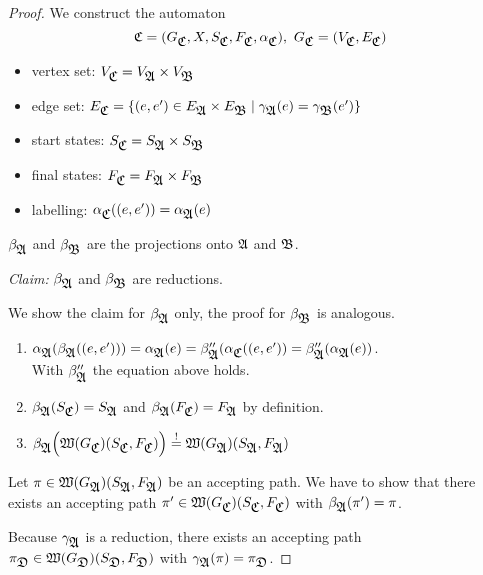 \begin{proof}
We construct the automaton
\[ \fa{C} = (G_{\fa{C}}, X, S_{\fa{C}}, F_{\fa{C}}, \alpha_{\fa{C}}),\
G_{\fa{C}}=(V_{\fa{C}}, E_{\fa{C}}) \]
\begin{itemize}
\item vertex set: $V_{\fa{C}} = V_{\fa{A}} \times V_{\fa{B}}$
\item edge set: $ E_{\fa{C}} = \setof{(e, e') \in E_{\fa{A}} \times
E_{\fa{B}} \mid \gamma_{\fa{A}}(e) = \gamma_{\fa{B}}(e')}$
\item start states: $S_{\fa{C}} = S_{\fa{A}} \times S_{\fa{B}}$
\item final states: $F_{\fa{C}} = F_{\fa{A}} \times F_{\fa{B}}$
\item labelling: $\alpha_{\fa{C}}((e, e')) = \alpha_{\fa{A}}(e)$ 
\end{itemize}

$\beta_{\fa{A}}$ and $\beta_{\fa{B}}$ are the projections onto $\fa{A}$ and
$\fa{B}$.

{\em Claim:} $\beta_{\fa{A}}$ and $\beta_{\fa{B}}$ are reductions.

We show the claim for $\beta_{\fa{A}}$ only, the proof for $\beta_{\fa{B}}$ is
analogous.

\begin{enumerate}
	\item $\alpha_{\fa{A}}(\beta_{\fa{A}}((e,e'))) = \alpha_{\fa{A}}(e) =
	\beta''_{\fa{A}}(\alpha_{\fa{C}}((e, e')) =
	\beta''_{\fa{A}}(\alpha_{\fa{A}}(e))$. \\
	With $\beta''_{\fa{A}}$ the equation above holds.
	
	\item $\beta_{\fa{A}}(S_{\fa{C}}) = S_{\fa{A}}$ and $\beta_{\fa{A}}(F_{\fa{C}})
	= F_{\fa{A}}$ by definition.
	
	\item $\beta_{\fa{A}}\Big(\pathcat{G_{\fa{C}}}(S_{\fa{C}}, F_{\fa{C}})\Big)
	\stackrel{!}{=} \pathcat{G_{\fa{A}}}(S_{\fa{A}}, F_{\fa{A}})$
\end{enumerate}

Let $\pi \in \pathcat{G_{\fa{A}}}(S_{\fa{A}}, F_{\fa{A}})$ be an accepting path.
We have to show that there exists an accepting path $\pi' \in
\pathcat{G_{\fa{C}}}(S_{\fa{C}}, F_{\fa{C}})$ with $\beta_{\fa{A}}(\pi') = \pi$.

Because $\gamma_{\fa{A}}$ is a reduction, there exists an accepting path
$\pi_{\fa{D}} \in \pathcat{G_{\fa{D}}}(S_{\fa{D}}, F_{\fa{D}})$ with
$\gamma_{\fa{A}}(\pi) = \pi_{\fa{D}}$.


\end{proof}
